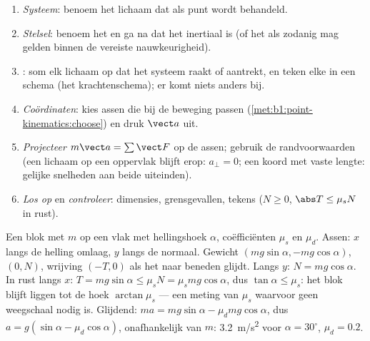 \begin{method}\label{met:b1:newton-dynamics:method}
\begin{enumerate}
  \item \emph{Systeem}: benoem het lichaam dat als punt wordt behandeld.
  \item \emph{Stelsel}: benoem het en ga na dat het inertiaal is (of het als
        zodanig mag gelden binnen de vereiste nauwkeurigheid).
  \item \emph{}: som elk lichaam op dat het systeem raakt of aantrekt,
        en teken elke  in een schema (het
        krachtenschema); er komt niets anders bij.
  \item \emph{Coördinaten}: kies assen die bij de beweging passen
        (\cref{met:b1:point-kinematics:choose}) en druk $\vect a$ uit.
  \item \emph{Projecteer} $m\vect a = \sum\vect F$ op de assen; gebruik de
        randvoorwaarden (een lichaam op een oppervlak blijft erop: $a_\perp = 0$; een
        koord met vaste lengte: gelijke snelheden aan beide uiteinden).
  \item \emph{Los op} en \emph{controleer}: dimensies, grensgevallen,
        tekens ($N \geq 0$, $\abs T \leq \mu_sN$ in rust).
\end{enumerate}
\end{method}

\begin{example}\label{ex:b1:newton-dynamics:incline}
Een blok met  $m$ op een vlak met hellingshoek $\alpha$, coëfficiënten $\mu_s$
en $\mu_d$. Assen: $x$ langs de helling omlaag, $y$ langs de normaal. Gewicht
$(mg\sin\alpha, -mg\cos\alpha)$,  $(0, N)$, wrijving $(-T, 0)$
als het naar beneden glijdt. Langs $y$: $N = mg\cos\alpha$. In rust langs $x$:
$T = mg\sin\alpha \leq \mu_sN = \mu_smg\cos\alpha$, dus $\tan\alpha
\leq \mu_s$: het blok blijft liggen tot de hoek $\arctan\mu_s$ --- een
meting van $\mu_s$ waarvoor geen weegschaal nodig is. Glijdend: $ma = mg\sin\alpha -
\mu_dmg\cos\alpha$, dus $a = g(\sin\alpha - \mu_d\cos\alpha)$, onafhankelijk
van $m$: \qty{3.2}{m/s^2} voor $\alpha = 30^\circ$, $\mu_d = 0.2$.
\end{example}

